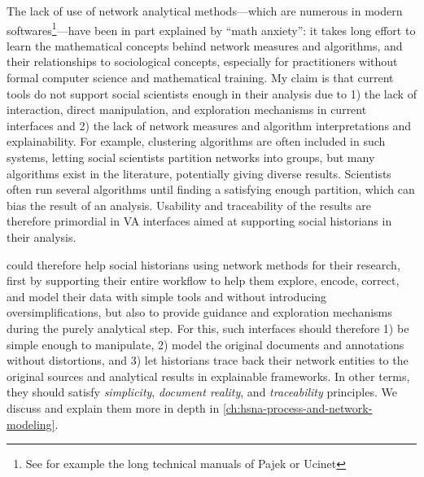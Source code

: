 The lack of use of network analytical methods---which are numerous in modern \sna softwares\footnote{See for example the long  technical manuals of Pajek\cite{pajek} or Ucinet\cite{johnsonUCINETSoftwareTool1987}}---have been in part explained by ``math anxiety''\cite{paxtonDollarsSenseConvincing2006}: it takes long effort to learn the mathematical concepts behind network measures and algorithms, and their relationships to sociological concepts\cite{rollingerProlegomenaProblemsPerspectives2020}, especially for practitioners without formal computer science and mathematical training.
My claim is that current \hsna tools do not support social scientists enough in their analysis due to 1) the lack of interaction, direct manipulation, and exploration mechanisms in current interfaces and 2) the lack of network measures and algorithm interpretations and explainability.
For example, clustering algorithms are often included in such systems, letting social scientists partition networks into groups, but many algorithms exist in the literature, potentially giving diverse results.
Scientists often run several algorithms until finding a satisfying enough partition, which can bias the result of an analysis\cite{pisterIntegratingPriorKnowledge2021}.
Usability and traceability of the results are therefore primordial in VA interfaces aimed at supporting social historians in their analysis.

\va could therefore help social historians using network methods for their research, first by supporting their entire workflow to help them explore, encode, correct, and model their data with simple tools and without introducing oversimplifications, but also to provide guidance and exploration mechanisms during the purely analytical step.
For this, such interfaces should therefore 1) be simple enough to manipulate, 2) model the original documents and annotations without distortions, and 3) let historians trace back their network entities to the original sources and analytical results in explainable frameworks.
In other terms, they should satisfy \emph{simplicity}, \emph{document reality}, and \emph{traceability} principles.
We discuss and explain them more in depth in \autoref{ch:hsna-process-and-network-modeling}.





